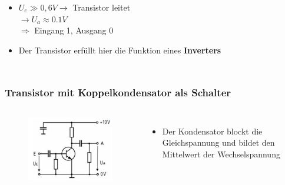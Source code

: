 \begin{frame}
\begin{columns}
\begin{itemize}
      \item $U_e \gg 0,6 V \rightarrow$ Transistor leitet\\ $\rightarrow U_a \approx 0.1 V$\\ $\Rightarrow$ Eingang 1, Ausgang 0
      \item Der Transistor erfüllt hier die Funktion eines \textbf{Inverters}
    \end{itemize}
  \end{columns}
\end{frame}

\begin{frame}
  \frametitle{Transistor mit Koppelkondensator als Schalter}
  \begin{columns}
    \begin{center}
      \begin{figure}
        \includegraphics[width=\textwidth,height=.85\textheight,keepaspectratio]{a06/Transistor-Schalter+C.png}
      \end{figure}
    \end{center}
    \begin{itemize}
      \item Der Kondensator blockt die Gleichspannung und bildet den Mittelwert der Wechselspannung
    \end{itemize}
  \end{columns}
\end{frame}

